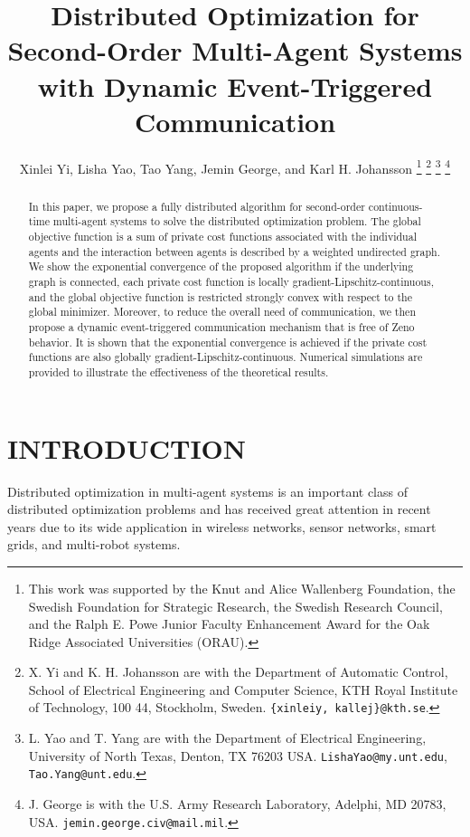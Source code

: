 \documentclass[letterpaper, 10 pt, conference]{ieeeconf}  %
\title{\LARGE \bf
Distributed  Optimization for Second-Order Multi-Agent Systems with Dynamic Event-Triggered Communication
}
\author{Xinlei Yi, Lisha Yao, Tao Yang, Jemin George, and Karl H. Johansson%
\thanks{This work was supported by the
Knut and Alice Wallenberg Foundation, the  Swedish Foundation for Strategic Research, the Swedish Research Council, and  the Ralph E. Powe Junior Faculty Enhancement Award for the Oak Ridge Associated Universities (ORAU).}%
\thanks{X. Yi and K. H. Johansson are with the Department of Automatic Control, School of Electrical Engineering and Computer Science, KTH Royal Institute of Technology, 100 44, Stockholm, Sweden.
        {\tt\small \{xinleiy, kallej\}@kth.se}.}%
\thanks{L. Yao and T. Yang are with the Department of Electrical Engineering, University of North Texas, Denton, TX 76203 USA. {\tt\small LishaYao@my.unt.edu}, {\tt\small Tao.Yang@unt.edu}.}
\thanks{J. George is with the U.S. Army Research Laboratory, Adelphi, MD 20783, USA. {\tt\small jemin.george.civ@mail.mil}.}
}
\begin{document}
\maketitle
\thispagestyle{empty}
\pagestyle{empty}



\begin{abstract}\label{cdc18so:Abstract}In this paper, we propose a fully distributed algorithm for second-order continuous-time multi-agent systems to solve the distributed optimization problem. The global objective function is a sum of private cost functions associated with the individual agents and  the interaction between agents is described by a weighted undirected graph. We show the exponential convergence of the proposed algorithm if the underlying graph is connected, each private cost function is locally  gradient-Lipschitz-continuous, and the global objective function is restricted strongly convex with respect to the global minimizer. Moreover, to reduce
the overall need of communication, we then propose a dynamic event-triggered communication mechanism that is free of Zeno behavior. It is shown that the exponential convergence is achieved if the private cost functions are also globally gradient-Lipschitz-continuous. Numerical simulations are provided to illustrate the effectiveness of the theoretical results.
\end{abstract}
\section{INTRODUCTION}\label{cdc18sosec:intro}

Distributed optimization in multi-agent systems is an important class of distributed optimization problems and has received great attention in recent years due to its wide application in wireless networks, sensor networks, smart grids, and multi-robot systems.
\end{document}
